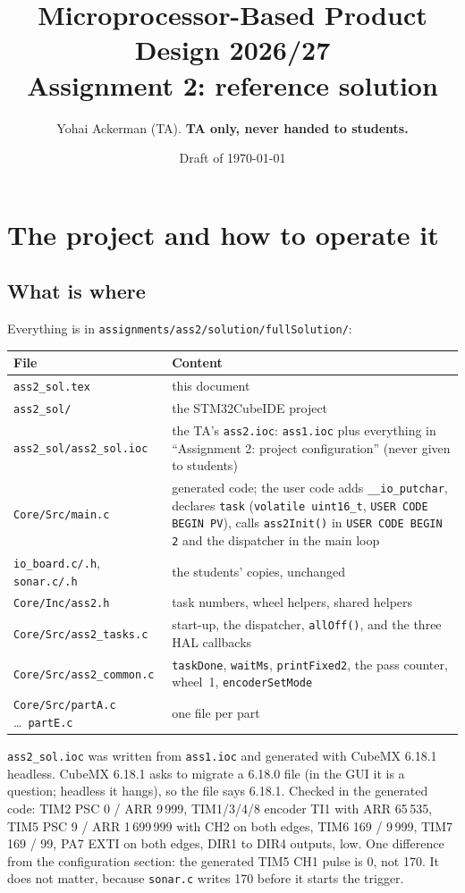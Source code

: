 \documentclass[11pt,a4paper]{article}
\title{Microprocessor-Based Product Design 2026/27\\[2pt]\large Assignment 2: reference solution}
\author{Yohai Ackerman (TA). \textbf{TA only, never handed to students.}}
\date{Draft of \today}
\newcommand{\lv}[1]{\texttt{#1}}                 %
\begin{document}
\maketitle

\section{The project and how to operate it}

\subsection{What is where}
Everything is in \texttt{assignments/ass2/solution/fullSolution/}:

\smallskip\noindent
\begin{tabularx}{\textwidth}{@{}l L@{}}
\toprule
File & Content \\
\midrule
\texttt{ass2\_sol.tex} & this document \\
\texttt{ass2\_sol/} & the STM32CubeIDE project \\
\texttt{ass2\_sol/ass2\_sol.ioc} & the TA's \texttt{ass2.ioc}: \texttt{ass1.ioc} plus everything in ``Assignment 2: project
  configuration'' (never given to students) \\
\texttt{Core/Src/main.c} & generated code; the user code adds \texttt{\_\_io\_putchar}, declares \lv{task}
  (\texttt{volatile uint16\_t}, \texttt{USER CODE BEGIN PV}), calls \texttt{ass2Init()} in \texttt{USER CODE BEGIN 2}
  and the dispatcher in the main loop \\
\texttt{io\_board.c/.h}, \texttt{sonar.c/.h} & the students' copies, unchanged \\
\texttt{Core/Inc/ass2.h} & task numbers, wheel helpers, shared helpers \\
\texttt{Core/Src/ass2\_tasks.c} & start-up, the dispatcher, \texttt{allOff()}, and the three HAL callbacks \\
\texttt{Core/Src/ass2\_common.c} & \texttt{taskDone}, \texttt{waitMs}, \texttt{printFixed2}, the pass counter, wheel~1,
  \texttt{encoderSetMode} \\
\texttt{Core/Src/partA.c} \ldots\ \texttt{partE.c} & one file per part \\
\bottomrule
\end{tabularx}

\smallskip\noindent
\texttt{ass2\_sol.ioc} was written from \texttt{ass1.ioc} and generated with CubeMX 6.18.1 headless. CubeMX 6.18.1
asks to migrate a 6.18.0 file (in the GUI it is a question; headless it hangs), so the file says 6.18.1. Checked in the
generated code: TIM2 PSC 0 / ARR 9\,999, TIM1/3/4/8 encoder TI1 with ARR 65\,535, TIM5 PSC 9 / ARR 1\,699\,999 with
CH2 on both edges, TIM6 169 / 9\,999, TIM7 169 / 99, PA7 EXTI on both edges, DIR1 to DIR4 outputs, low. One
difference from the configuration section: the generated TIM5 CH1 pulse is 0, not 170. It does not matter, because
\texttt{sonar.c} writes 170 before it starts the trigger.
\end{document}
